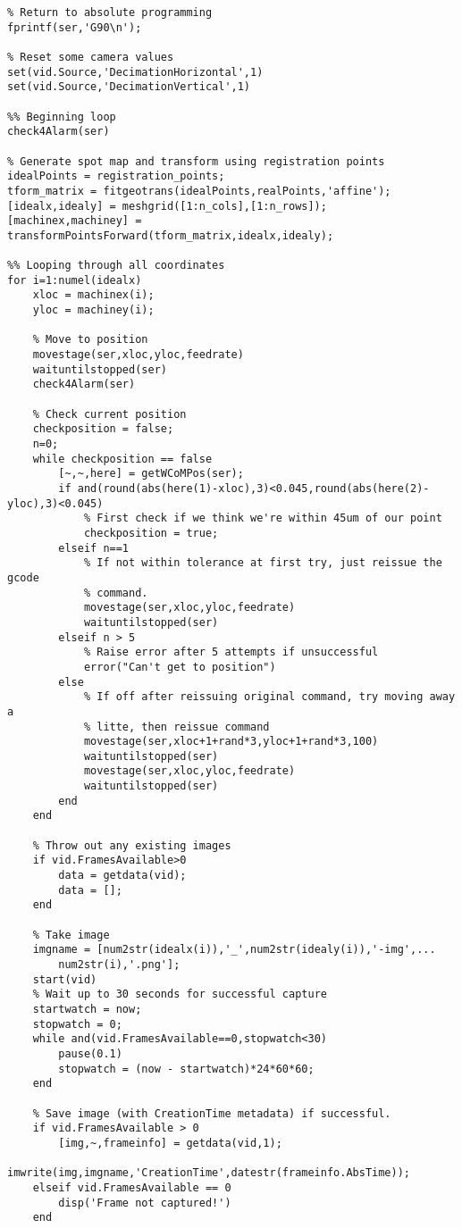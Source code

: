 \begin{lstlisting}
% Return to absolute programming
fprintf(ser,'G90\n');

% Reset some camera values
set(vid.Source,'DecimationHorizontal',1)
set(vid.Source,'DecimationVertical',1)

%% Beginning loop
check4Alarm(ser)

% Generate spot map and transform using registration points
idealPoints = registration_points;
tform_matrix = fitgeotrans(idealPoints,realPoints,'affine');
[idealx,idealy] = meshgrid([1:n_cols],[1:n_rows]);
[machinex,machiney] = transformPointsForward(tform_matrix,idealx,idealy);

%% Looping through all coordinates
for i=1:numel(idealx)
    xloc = machinex(i);
    yloc = machiney(i);
    
    % Move to position
    movestage(ser,xloc,yloc,feedrate)
    waituntilstopped(ser)
    check4Alarm(ser)
    
    % Check current position
    checkposition = false;
    n=0;
    while checkposition == false
        [~,~,here] = getWCoMPos(ser);
        if and(round(abs(here(1)-xloc),3)<0.045,round(abs(here(2)-yloc),3)<0.045)
            % First check if we think we're within 45um of our point
            checkposition = true;
        elseif n==1
            % If not within tolerance at first try, just reissue the gcode
            % command.
            movestage(ser,xloc,yloc,feedrate)
            waituntilstopped(ser)
        elseif n > 5
            % Raise error after 5 attempts if unsuccessful
            error("Can't get to position")
        else
            % If off after reissuing original command, try moving away a
            % litte, then reissue command
            movestage(ser,xloc+1+rand*3,yloc+1+rand*3,100)
            waituntilstopped(ser)
            movestage(ser,xloc,yloc,feedrate)
            waituntilstopped(ser)
        end
    end
    
    % Throw out any existing images
    if vid.FramesAvailable>0
        data = getdata(vid);
        data = [];
    end
    
    % Take image
    imgname = [num2str(idealx(i)),'_',num2str(idealy(i)),'-img',...
        num2str(i),'.png'];
    start(vid)
    % Wait up to 30 seconds for successful capture
    startwatch = now;
    stopwatch = 0;
    while and(vid.FramesAvailable==0,stopwatch<30)
        pause(0.1)
        stopwatch = (now - startwatch)*24*60*60;
    end
    
    % Save image (with CreationTime metadata) if successful.
    if vid.FramesAvailable > 0
        [img,~,frameinfo] = getdata(vid,1);
        imwrite(img,imgname,'CreationTime',datestr(frameinfo.AbsTime));
    elseif vid.FramesAvailable == 0
        disp('Frame not captured!')
    end
    

\end{lstlisting}
